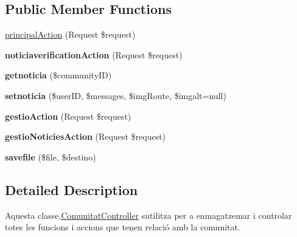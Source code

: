 \subsection*{Public Member Functions}
\begin{DoxyCompactItemize}
\item 
\mbox{\hyperlink{class_app_bundle_1_1_controller_1_1_comunitat_controller_a54cf6158ce22df4010684dd37f98d70c}{principal\+Action}} (Request \$request)
\item 
\mbox{\label{class_app_bundle_1_1_controller_1_1_comunitat_controller_adec93957e425d37e1604d2bd46cb3017}} 
{\bfseries noticiaverification\+Action} (Request \$request)
\item 
\mbox{\label{class_app_bundle_1_1_controller_1_1_comunitat_controller_ad9b2e6905cc977518c2065e30aef25fb}} 
{\bfseries getnoticia} (\$community\+ID)
\item 
\mbox{\label{class_app_bundle_1_1_controller_1_1_comunitat_controller_a6cf3f7cfec53fdb8c5e0be4779246f05}} 
{\bfseries setnoticia} (\$user\+ID, \$messages, \$img\+Route, \$imgalt=null)
\item 
\mbox{\label{class_app_bundle_1_1_controller_1_1_comunitat_controller_a0d529fdcc2dd3d0c72a64804cf8881b0}} 
{\bfseries gestio\+Action} (Request \$request)
\item 
\mbox{\label{class_app_bundle_1_1_controller_1_1_comunitat_controller_a5d57ea5d895a2e155621411c278f874c}} 
{\bfseries gestio\+Noticies\+Action} (Request \$request)
\item 
\mbox{\label{class_app_bundle_1_1_controller_1_1_comunitat_controller_a528f3fb0536e379ef17f399680cde330}} 
{\bfseries savefile} (\$file, \$destino)
\end{DoxyCompactItemize}


\subsection{Detailed Description}
Aquesta classe,\mbox{\hyperlink{class_app_bundle_1_1_controller_1_1_comunitat_controller}{Comunitat\+Controller}} s\textquotesingle{}utilitza per a enmagatzemar i controlar totes les funcions i accions que tenen relació amb la comunitat.

